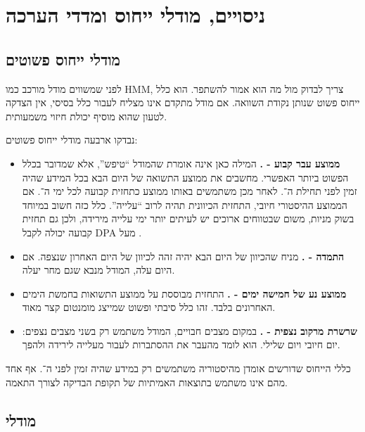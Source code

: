 \section{ניסויים, מודלי ייחוס ומדדי הערכה}

\subsection{מודלי ייחוס פשוטים}

לפני שמשווים מודל מורכב כמו HMM, צריך לבדוק מול מה הוא אמור להשתפר.  הוא כלל ייחוס פשוט שנותן נקודת השוואה. אם מודל מתקדם אינו מצליח לעבור כלל בסיסי, אין הצדקה לטעון שהוא מוסיף יכולת חיזוי משמעותית.

נבדקו ארבעה מודלי ייחוס פשוטים:

\begin{itemize}
    \item \textbf{ממוצע עבר קבוע - .} המילה  כאן אינה אומרת שהמודל ``טיפש'', אלא שמדובר בכלל הפשוט ביותר האפשרי. מחשבים את ממוצע התשואה של היום הבא בכל המידע שהיה זמין לפני תחילת ה־. לאחר מכן משתמשים באותו ממוצע כתחזית קבועה לכל ימי ה־. אם הממוצע ההיסטורי חיובי, התחזית הכיוונית תהיה לרוב ``עלייה''. כלל כזה חשוב במיוחד בשוק מניות, משום שבטווחים ארוכים יש לעיתים יותר ימי עלייה מירידה, ולכן גם תחזית קבועה יכולה לקבל DPA מעל .

    \item \textbf{התמדה - .} מניח שהכיוון של היום הבא יהיה זהה לכיוון של היום האחרון שנצפה. אם היום עלה, המודל מנבא שגם מחר יעלה.

    \item \textbf{ממוצע נע של חמישה ימים - .} התחזית מבוססת על ממוצע התשואות בחמשת הימים האחרונים בלבד. זהו כלל סיבתי ופשוט שמייצג מומנטום קצר מאוד.

    \item \textbf{שרשרת מרקוב נצפית - .} במקום מצבים חבויים, המודל משתמש רק בשני מצבים נצפים: יום חיובי ויום שלילי. הוא לומד מהעבר את ההסתברות לעבור מעלייה לירידה ולהפך.
\end{itemize}

כללי הייחוס שדורשים אומדן מהיסטוריה משתמשים רק במידע שהיה זמין לפני ה־. אף אחד מהם אינו משתמש בתוצאות האמיתיות של תקופת הבדיקה לצורך התאמה.

\subsection{מודלי }

